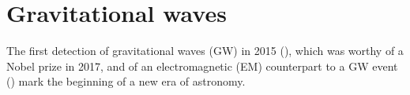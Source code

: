 




\section{Gravitational waves}\label{sec:introgw}

The first detection of gravitational waves (GW) in 2015 (\citealt{ligogw150914}), which was worthy of a Nobel prize in 2017, and of an electromagnetic (EM) counterpart to a GW event (\citealt{MMApaper}) mark the beginning of a new era of astronomy.

